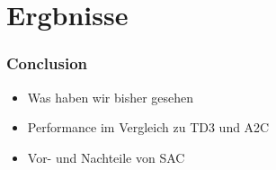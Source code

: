 \section*{Ergbnisse}
\begin{frame}
    \frametitle{Conclusion}
    \begin{itemize}    
        \item Was haben wir bisher gesehen
        \item Performance im Vergleich zu TD3 und A2C
        \item Vor- und Nachteile von SAC
    \end{itemize}
\end{frame}
